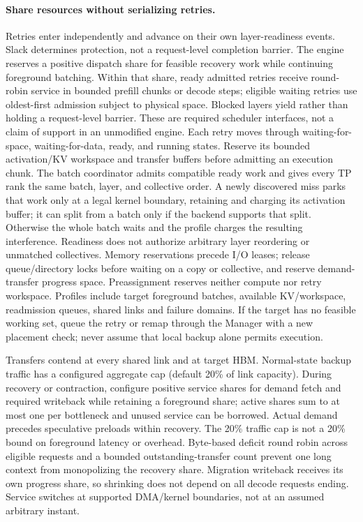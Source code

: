 \paragraph{Share resources without serializing retries.}
Retries enter independently and advance on their own layer-readiness
events. Slack determines protection, not a request-level completion
barrier. The engine reserves a positive dispatch share for feasible recovery
work while continuing foreground batching. Within that share, ready admitted
retries receive round-robin service in bounded prefill chunks or decode steps;
eligible waiting retries use oldest-first admission subject to physical space.
Blocked layers yield rather than holding a request-level barrier. These are
required scheduler interfaces, not a claim of support in an unmodified engine.
Each retry moves through waiting-for-space, waiting-for-data, ready, and
running states. Reserve its bounded activation/KV workspace and transfer
buffers before admitting an execution chunk. The batch coordinator admits
compatible ready work and gives every TP rank the same batch, layer, and
collective order. A newly discovered miss parks that work only at a legal
kernel boundary, retaining and charging its activation buffer; it can split
from a batch only if the backend supports that split. Otherwise the whole
batch waits and the profile charges the resulting interference. Readiness
does not authorize arbitrary layer reordering or unmatched collectives.
Memory reservations precede I/O leases; release queue/directory locks before
waiting on a copy or collective, and reserve demand-transfer progress space.
Preassignment reserves neither compute nor retry workspace. Profiles
include target foreground batches, available KV/workspace, readmission
queues, shared links and failure domains. If the target has no feasible
working set, queue the retry or remap through the Manager with a new
placement check; never assume that local backup alone permits execution.

Transfers contend at every shared link and at target HBM. Normal-state
backup traffic has a configured aggregate cap (default 20\% of link
capacity). During recovery or contraction, configure positive service
shares for demand fetch and required writeback while retaining a foreground
share; active shares sum to at most one per bottleneck and unused service
can be borrowed. Actual demand precedes speculative preloads within recovery.
The 20\% traffic cap is not a 20\% bound on foreground latency or overhead.
Byte-based deficit round robin across eligible requests and a bounded
outstanding-transfer count prevent one long context from monopolizing
the recovery share. Migration writeback receives its own progress share,
so shrinking does not depend on all decode requests ending. Service switches
at supported DMA/kernel boundaries, not at an assumed arbitrary instant.

